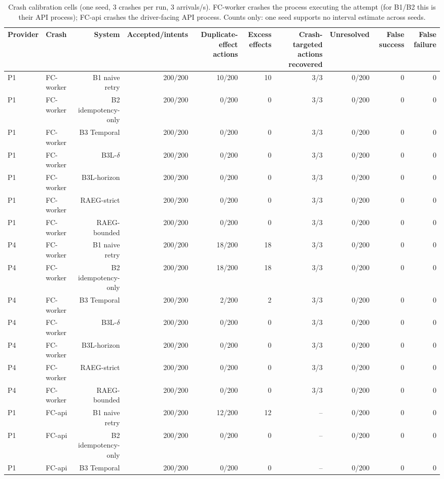 \begin{table}[t]
\centering
\scriptsize
\caption{Crash calibration cells (one seed, 3 crashes per run, 3 arrivals/s). FC-worker crashes the process executing the attempt (for B1/B2 this is their API process); FC-api crashes the driver-facing API process. Counts only: one seed supports no interval estimate across seeds.}
\label{tab:m7-crash}
\begin{tabular}{llrrrrrrrr}
\toprule
Provider & Crash & System & Accepted/intents & Duplicate-effect actions & Excess effects & Crash-targeted actions recovered & Unresolved & False success & False failure \\
\midrule
P1 & FC-worker & B1 naive retry & 200/200 & 10/200 & 10 & 3/3 & 0/200 & 0 & 0 \\
P1 & FC-worker & B2 idempotency-only & 200/200 & 0/200 & 0 & 3/3 & 0/200 & 0 & 0 \\
P1 & FC-worker & B3 Temporal & 200/200 & 0/200 & 0 & 3/3 & 0/200 & 0 & 0 \\
P1 & FC-worker & B3L-$\delta$ & 200/200 & 0/200 & 0 & 3/3 & 0/200 & 0 & 0 \\
P1 & FC-worker & B3L-horizon & 200/200 & 0/200 & 0 & 3/3 & 0/200 & 0 & 0 \\
P1 & FC-worker & RAEG-strict & 200/200 & 0/200 & 0 & 3/3 & 0/200 & 0 & 0 \\
P1 & FC-worker & RAEG-bounded & 200/200 & 0/200 & 0 & 3/3 & 0/200 & 0 & 0 \\
P4 & FC-worker & B1 naive retry & 200/200 & 18/200 & 18 & 3/3 & 0/200 & 0 & 0 \\
P4 & FC-worker & B2 idempotency-only & 200/200 & 18/200 & 18 & 3/3 & 0/200 & 0 & 0 \\
P4 & FC-worker & B3 Temporal & 200/200 & 2/200 & 2 & 3/3 & 0/200 & 0 & 0 \\
P4 & FC-worker & B3L-$\delta$ & 200/200 & 0/200 & 0 & 3/3 & 0/200 & 0 & 0 \\
P4 & FC-worker & B3L-horizon & 200/200 & 0/200 & 0 & 3/3 & 0/200 & 0 & 0 \\
P4 & FC-worker & RAEG-strict & 200/200 & 0/200 & 0 & 3/3 & 0/200 & 0 & 0 \\
P4 & FC-worker & RAEG-bounded & 200/200 & 0/200 & 0 & 3/3 & 0/200 & 0 & 0 \\
P1 & FC-api & B1 naive retry & 200/200 & 12/200 & 12 & -- & 0/200 & 0 & 0 \\
P1 & FC-api & B2 idempotency-only & 200/200 & 0/200 & 0 & -- & 0/200 & 0 & 0 \\
P1 & FC-api & B3 Temporal & 200/200 & 0/200 & 0 & -- & 0/200 & 0 & 0 \\

\end{tabular}
\end{table}

